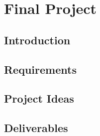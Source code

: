 \section{Final Project}

\subsection{Introduction}

\subsection{Requirements}

\subsection{Project Ideas}

\subsection{Deliverables}

